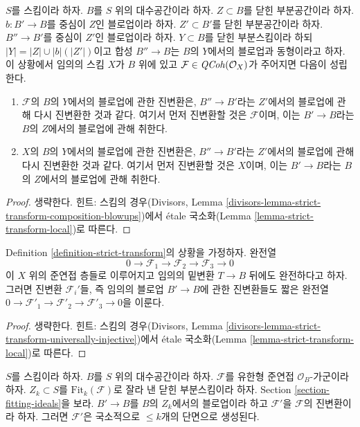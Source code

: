 \begin{lemma}
\label{lemma-strict-transform-composition-blowups}
$S$를 스킴이라 하자. $B$를 $S$ 위의 대수공간이라 하자.
$Z \subset B$를 닫힌 부분공간이라 하자.
$b : B' \to B$를 중심이 $Z$인 블로업이라 하자.
$Z' \subset B'$를 닫힌 부분공간이라 하자.
$B'' \to B'$를 중심이 $Z'$인 블로업이라 하자.
$Y \subset B$를 닫힌 부분스킴이라 하되
$|Y| = |Z| \cup |b|(|Z'|)$이고 합성 $B'' \to B$는 $B$의 $Y$에서의
블로업과 동형이라고 하자. 이 상황에서 임의의 스킴 $X$가 $B$ 위에 있고
$\mathcal{F} \in \mathit{QCoh}(\mathcal{O}_X)$가 주어지면 다음이 성립한다.
\begin{enumerate}
\item $\mathcal{F}$의 $B$의 $Y$에서의 블로업에 관한 진변환은,
$B'' \to B'$라는 $Z'$에서의 블로업에 관해 다시 진변환한 것과 같다.
여기서 먼저 진변환할 것은 $\mathcal{F}$이며, 이는
$B' \to B$라는 $B$의 $Z$에서의 블로업에 관해 취한다.
\item $X$의 $B$의 $Y$에서의 블로업에 관한 진변환은,
$B'' \to B'$라는 $Z'$에서의 블로업에 관해 다시 진변환한 것과 같다.
여기서 먼저 진변환할 것은 $X$이며, 이는
$B' \to B$라는 $B$의 $Z$에서의 블로업에 관해 취한다.
\end{enumerate}
\end{lemma}

\begin{proof}
생략한다. 힌트: 스킴의 경우(Divisors, Lemma
\ref{divisors-lemma-strict-transform-composition-blowups})에서 \'etale
국소화(Lemma \ref{lemma-strict-transform-local})로 따른다.
\end{proof}

\begin{lemma}
\label{lemma-strict-transform-universally-injective}
Definition \ref{definition-strict-transform}의 상황을 가정하자. 완전열
$$
0 \to \mathcal{F}_1 \to \mathcal{F}_2 \to \mathcal{F}_3 \to 0
$$
이 $X$ 위의 준연접 층들로 이루어지고 임의의 밑변환 $T \to B$ 뒤에도
완전하다고 하자. 그러면 진변환 $\mathcal{F}_i'$들, 즉 임의의 블로업
$B' \to B$에 관한 진변환들도 짧은 완전열
$0 \to \mathcal{F}'_1 \to \mathcal{F}'_2 \to \mathcal{F}'_3 \to 0$을
이룬다.
\end{lemma}

\begin{proof}
생략한다. 힌트: 스킴의 경우(Divisors, Lemma
\ref{divisors-lemma-strict-transform-universally-injective})에서 \'etale
국소화(Lemma \ref{lemma-strict-transform-local})로 따른다.
\end{proof}

\begin{lemma}
\label{lemma-strict-transform-blowup-fitting-ideal}
$S$를 스킴이라 하자. $B$를 $S$ 위의 대수공간이라 하자.
$\mathcal{F}$를 유한형 준연접 $\mathcal{O}_B$-가군이라 하자.
$Z_k \subset S$를 $\text{Fit}_k(\mathcal{F})$로 잘라 낸 닫힌
부분스킴이라 하자. Section \ref{section-fitting-ideals}을 보라.
$B' \to B$를 $B$의 $Z_k$에서의 블로업이라 하고
$\mathcal{F}'$을 $\mathcal{F}$의 진변환이라 하자.
그러면 $\mathcal{F}'$은 국소적으로 $\leq k$개의 단면으로 생성된다.
\end{lemma}

